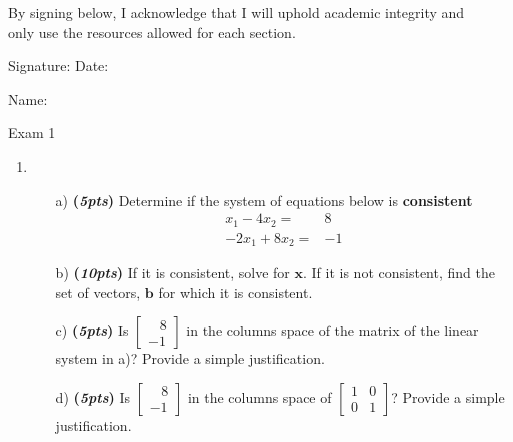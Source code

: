 \documentclass[12pt]{article}%
\begin{document}
By signing below, I \hrulefill \hrulefill \hspace{0.2cm} acknowledge that I will uphold academic integrity and\\ only use the resources allowed for each section.

\vspace{1cm}
Signature:\hrulefill \hspace{2cm} Date:\hrulefill

\vspace{0.5cm}

Name:\hrulefill

\newpage

Exam 1
\\
\HRule


\begin{enumerate}     
    \item 
    \begin{itemize}
        \item[a)] \textbf{(\emph{5pts})} Determine if the system of equations below is \textbf{consistent}
        \begin{eqnarray*}
            x_1 - 4x_2 =& 8\\
            -2x_1 + 8x_2 =& -1
        \end{eqnarray*}
        \vspace{3.5cm}
        \item[b)]\textbf{(\emph{10pts})} If it is consistent, solve for \(\mathbf{x}\).
        If it is not consistent, find the set of vectors, \(\mathbf{b}\) for which it is consistent.
        \vspace{6cm}
        \item[c)]\textbf{(\emph{5pts})} Is \(\begin{bmatrix} \;\;\;8\\-1 \end{bmatrix}\) in the columns space of the matrix of the linear system in a)?
        Provide  a simple justification.
        \vspace{4cm}
        \item[d)]\textbf{(\emph{5pts})} Is \(\begin{bmatrix} \;\;\;8\\-1 \end{bmatrix}\) in the columns space of \(\begin{bmatrix} 1 & 0 \\ 0 & 1 \end{bmatrix}\)?
        Provide a simple justification.
    \end{itemize}
    

\end{enumerate}
\end{document}
